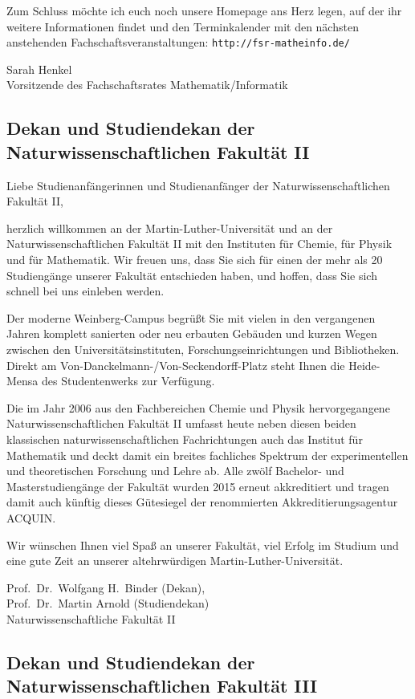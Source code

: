 Zum Schluss möchte ich euch noch unsere Homepage ans Herz legen, auf der ihr weitere Informationen findet und den Terminkalender mit den nächsten anstehenden Fachschaftsveranstaltungen: \texttt{http://fsr-matheinfo.de/}

Sarah Henkel\\
Vorsitzende des Fachschaftsrates Mathematik/Informatik


\subsection{Dekan und Studiendekan der Naturwissenschaftlichen Fakultät II}

Liebe Studienanfängerinnen und Studienanfänger der Naturwissenschaftlichen
Fakultät II,

herzlich willkommen an der Martin-Luther-Universität und an der
Naturwissenschaftlichen Fakultät II mit den Instituten für Chemie, für Physik
und für Mathematik. Wir freuen uns, dass Sie sich für einen der mehr als 20
Studiengänge unserer Fakultät entschieden haben, und hoffen, dass Sie sich
schnell bei uns einleben werden.

Der moderne Weinberg-Campus begrüßt Sie mit vielen in den vergangenen Jahren
komplett sanierten oder neu erbauten Gebäuden und kurzen Wegen zwischen den
Universitätsinstituten, Forschungseinrichtungen und Bibliotheken. Direkt am
Von-Danckelmann-/Von-Seckendorff-Platz steht Ihnen die Heide-Mensa des
Studentenwerks zur Verfügung.

Die im Jahr 2006 aus den Fachbereichen Chemie und Physik hervorgegangene
Naturwissenschaftlichen Fakultät II umfasst heute neben diesen beiden
klassischen naturwissenschaftlichen Fachrichtungen auch das Institut für
Mathematik und deckt damit ein breites fachliches Spektrum der experimentellen
und theoretischen Forschung und Lehre ab. Alle zwölf Bachelor- und
Masterstudiengänge der Fakultät wurden 2015 erneut
akkreditiert und tragen damit auch künftig dieses Gütesiegel der renommierten
Akkreditierungsagentur ACQUIN.

Wir wünschen Ihnen viel Spaß an unserer Fakultät, viel Erfolg im Studium und
eine gute Zeit an unserer altehrwürdigen Martin-Luther-Universität.

Prof.\ Dr.\ Wolfgang H.\ Binder (Dekan),\\
Prof.\ Dr.\ Martin Arnold (Studiendekan)\\
Naturwissenschaftliche Fakultät II 

\newpage

\subsection{Dekan und Studiendekan der Naturwissenschaftlichen Fakultät III}

